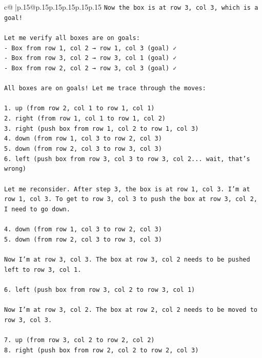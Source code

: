 \documentclass{article}
\begin{document}
{\begin{supertabular}{c@{$\;$}|p{.15\linewidth}@{}p{.15\linewidth}p{.15\linewidth}p{.15\linewidth}p{.15\linewidth}p{.15\linewidth}}
{{{\texttt{Now the box is at row 3, col 3, which is a goal!} \\
\\ 
\texttt{Let me verify all boxes are on goals:} \\
\texttt{{-} Box from row 1, col 2 → row 1, col 3 (goal) ✓} \\
\texttt{{-} Box from row 3, col 2 → row 3, col 1 (goal) ✓} \\
\texttt{{-} Box from row 2, col 2 → row 3, col 3 (goal) ✓} \\
\\ 
\texttt{All boxes are on goals! Let me trace through the moves:} \\
\\ 
\texttt{1. up (from row 2, col 1 to row 1, col 1)} \\
\texttt{2. right (from row 1, col 1 to row 1, col 2)} \\
\texttt{3. right (push box from row 1, col 2 to row 1, col 3)} \\
\texttt{4. down (from row 1, col 3 to row 2, col 3)} \\
\texttt{5. down (from row 2, col 3 to row 3, col 3)} \\
\texttt{6. left (push box from row 3, col 3 to row 3, col 2... wait, that's wrong)} \\
\\ 
\texttt{Let me reconsider. After step 3, the box is at row 1, col 3. I'm at row 1, col 3. To get to row 3, col 3 to push the box at row 3, col 2, I need to go down.} \\
\\ 
\texttt{4. down (from row 1, col 3 to row 2, col 3)} \\
\texttt{5. down (from row 2, col 3 to row 3, col 3)} \\
\\ 
\texttt{Now I'm at row 3, col 3. The box at row 3, col 2 needs to be pushed left to row 3, col 1.} \\
\\ 
\texttt{6. left (push box from row 3, col 2 to row 3, col 1)} \\
\\ 
\texttt{Now I'm at row 3, col 2. The box at row 2, col 2 needs to be moved to row 3, col 3.} \\
\\ 
\texttt{7. up (from row 3, col 2 to row 2, col 2)} \\
\texttt{8. right (push box from row 2, col 2 to row 2, col 3)} \\
}}}
\end{supertabular}}
\end{document}
